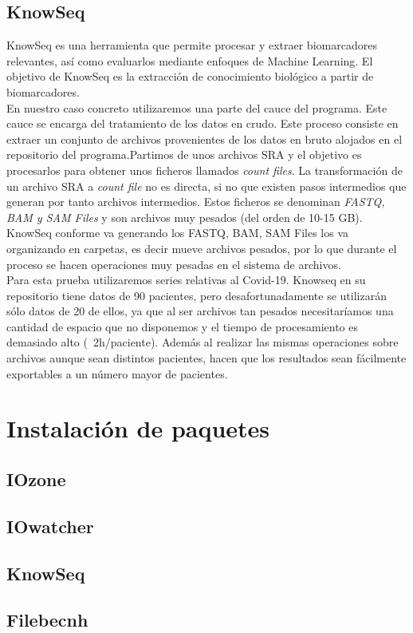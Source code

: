 \subsection{KnowSeq}
KnowSeq es una herramienta que permite procesar y extraer biomarcadores relevantes, así como evaluarlos mediante enfoques de Machine Learning. El objetivo de KnowSeq es la extracción de conocimiento biológico a partir de biomarcadores. \\

En nuestro caso concreto utilizaremos una parte del cauce del programa. Este cauce se encarga del tratamiento de los datos en crudo. Este proceso consiste en extraer un conjunto de archivos provenientes de los datos en bruto alojados en el repositorio del programa.Partimos de unos archivos SRA y el objetivo es procesarlos para obtener unos ficheros llamados \textit{count files}. La transformación de un archivo SRA a \textit{count file} no es directa, si no que existen pasos intermedios que generan por tanto archivos intermedios. Estos ficheros se denominan \textit{FASTQ, BAM y SAM Files} y son archivos muy pesados (del orden de 10-15 GB). KnowSeq conforme va generando los FASTQ, BAM, SAM Files los va organizando en carpetas, es decir mueve archivos pesados, por lo que durante el proceso se hacen operaciones muy pesadas en el sistema de archivos.\\

Para esta prueba utilizaremos series relativas al Covid-19. Knowseq en su repositorio tiene datos de 90 pacientes, pero desafortunadamente se utilizarán sólo datos de 20 de ellos, ya que al ser archivos tan pesados necesitaríamos una cantidad de espacio que no disponemos y el tiempo de procesamiento es demasiado alto (~2h/paciente). Además al realizar las mismas operaciones sobre archivos aunque sean distintos pacientes, hacen que los resultados sean fácilmente exportables a un número mayor de pacientes. 

\section{Instalación de paquetes}
\subsection{IOzone}
\subsection{IOwatcher}
\subsection{KnowSeq}
\subsection{Filebecnh}